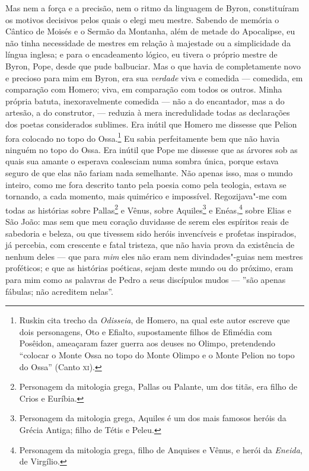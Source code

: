 Mas nem a força e a precisão, nem o ritmo da linguagem de Byron,
constituíram os motivos decisivos pelos quais o elegi meu mestre.
Sabendo de memória o Cântico de Moisés e o Sermão da Montanha, além de
metade do Apocalipse, eu não tinha necessidade de mestres em relação à
majestade ou a simplicidade da língua inglesa; e para o encadeamento
lógico, eu tivera o próprio mestre de Byron, Pope, desde que pude
balbuciar. Mas o que havia de completamente novo e precioso para mim em
Byron, era sua \textit{verdade} viva e comedida --- comedida, em comparação
com Homero; viva, em comparação com todos os outros. Minha própria
batuta, inexoravelmente comedida --- não a do encantador, mas a do
artesão, a do construtor, --- reduzia à mera incredulidade todas as
declarações dos poetas considerados sublimes. Era inútil que Homero me
dissesse que Pelion fora colocado no topo do Ossa.\footnote{Ruskin cita
  trecho da \textit{Odisseia}, de Homero, na qual este autor escreve
  que dois personagens, Oto e Efialto, supostamente filhos de Efimédia com
  Posêidon, ameaçaram fazer guerra aos deuses no Olimpo, pretendendo
  ``colocar o Monte Ossa no topo do Monte Olimpo e o Monte Pelion no
  topo do Ossa'' (Canto \textsc{xi}).} Eu sabia perfeitamente bem
que não havia ninguém no topo do Ossa. Era inútil que Pope me dissesse
que as árvores sob as quais sua amante o esperava coalesciam numa sombra
única, porque estava seguro de que elas não fariam nada semelhante. Não
apenas isso, mas o mundo inteiro, como me fora descrito tanto pela
poesia como pela teologia, estava se tornando, a cada momento, mais
quimérico e impossível. Regozijava"-me com todas as histórias sobre
Pallas\footnote{Personagem da mitologia grega, Pallas ou Palante, um dos
  titãs, era filho de Crios e Euríbia.} e Vênus, sobre
Aquiles\footnote{Personagem da mitologia grega, Aquiles é um dos mais
  famosos heróis da Grécia Antiga; filho de Tétis e Peleu.} e Enéas,\footnote{Personagem da mitologia grega, filho de
  Anquises e Vênus, e herói da \textit{Eneida}, de Virgílio.} sobre Elias e São João: mas sem que meu coração duvidasse de
serem eles espíritos reais de sabedoria e beleza, ou que tivessem sido
heróis invencíveis e profetas inspirados, já percebia, com crescente e
fatal tristeza, que não havia prova da existência de nenhum deles --- que
para \textit{mim} eles não eram nem divindades"-guias nem mestres
proféticos; e que as histórias poéticas, sejam deste mundo ou do
próximo, eram para mim como as palavras de Pedro a seus discípulos mudos
--- ''são apenas fábulas; não acreditem nelas''.

